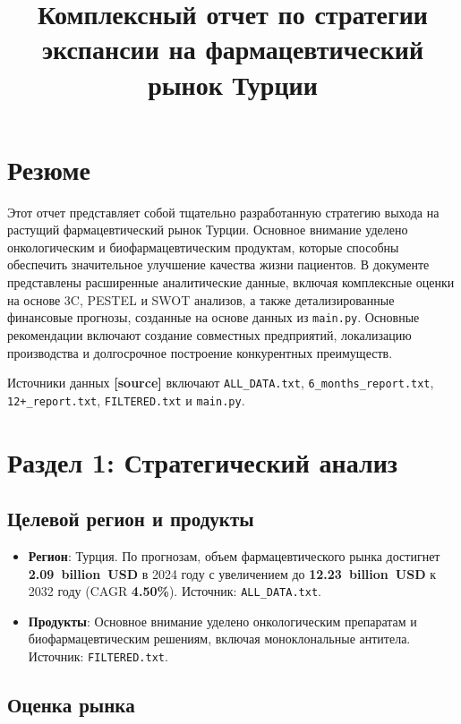 \documentclass[a4paper,12pt]{article}
\title{Комплексный отчет по стратегии экспансии на фармацевтический рынок Турции}
\author{}
\date{}
\begin{document}
\maketitle

\section*{Резюме}
Этот отчет представляет собой тщательно разработанную стратегию выхода на растущий фармацевтический рынок Турции. Основное внимание уделено онкологическим и биофармацевтическим продуктам, которые способны обеспечить значительное улучшение качества жизни пациентов. В документе представлены расширенные аналитические данные, включая комплексные оценки на основе 3C, PESTEL и SWOT анализов, а также детализированные финансовые прогнозы, созданные на основе данных из \texttt{main.py}. Основные рекомендации включают создание совместных предприятий, локализацию производства и долгосрочное построение конкурентных преимуществ.

Источники данных \textbf{[source]} включают \texttt{ALL\_DATA.txt}, \texttt{6\_months\_report.txt}, \texttt{12+\_report.txt}, \texttt{FILTERED.txt} и \texttt{main.py}.

\section{Раздел 1: Стратегический анализ}

\subsection{Целевой регион и продукты}
\begin{itemize}
    \item \textbf{Регион}: Турция. По прогнозам, объем фармацевтического рынка достигнет \textbf{2.09~billion~USD} в 2024 году с увеличением до \textbf{12.23~billion~USD} к 2032 году (CAGR \textbf{4.50\%}). Источник: \texttt{ALL\_DATA.txt}.
    \item \textbf{Продукты}: Основное внимание уделено онкологическим препаратам и биофармацевтическим решениям, включая моноклональные антитела. Источник: \texttt{FILTERED.txt}.
\end{itemize}

\subsection{Оценка рынка}
\end{document}
